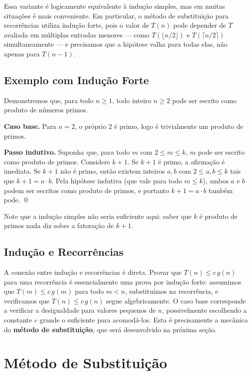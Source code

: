 \documentclass[9pt,a4paper]{extarticle}
\begin{document}
Essa variante é logicamente equivalente à indução simples, mas em muitas situações é mais conveniente. Em particular, o método de substituição para recorrências utiliza indução forte, pois o valor de $T(n)$ pode depender de $T$ avaliada em múltiplas entradas menores --- como $T(\lfloor n/2 \rfloor)$ e $T(\lceil n/2 \rceil)$ simultaneamente --- e precisamos que a hipótese valha para todas elas, não apenas para $T(n-1)$.

\subsection{Exemplo com Indução Forte}

Demonstremos que, para todo $n \geq 1$, todo inteiro $n \geq 2$ pode ser escrito como produto de números primos.

\textbf{Caso base.} Para $n = 2$, o próprio $2$ é primo, logo é trivialmente um produto de primos.

\textbf{Passo indutivo.} Suponha que, para todo $m$ com $2 \leq m \leq k$, $m$ pode ser escrito como produto de primos. Considere $k + 1$. Se $k + 1$ é primo, a afirmação é imediata. Se $k + 1$ não é primo, então existem inteiros $a, b$ com $2 \leq a, b \leq k$ tais que $k + 1 = a \cdot b$. Pela hipótese indutiva (que vale para todo $m \leq k$), ambos $a$ e $b$ podem ser escritos como produto de primos, e portanto $k + 1 = a \cdot b$ também pode. \qed

Note que a indução simples não seria suficiente aqui: saber que $k$ é produto de primos nada diz sobre a fatoração de $k+1$.

\subsection{Indução e Recorrências}

A conexão entre indução e recorrências é direta. Provar que $T(n) \leq c\,g(n)$ para uma recorrência é essencialmente uma prova por indução forte: assumimos que $T(m) \leq c\,g(m)$ para todo $m < n$, substituímos na recorrência, e verificamos que $T(n) \leq c\,g(n)$ segue algebricamente. O caso base corresponde a verificar a desigualdade para valores pequenos de $n$, possivelmente escolhendo a constante $c$ grande o suficiente para acomodá-los. Esta é precisamente a mecânica do \textbf{método de substituição}, que será desenvolvido na próxima seção.

\section{Método de Substituição}
\end{document}

